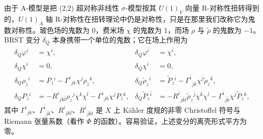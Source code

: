 由于 A-模型是把 (2,2) 超对称非线性 $\sigma$-模型按其 $U(1)_V$ 向量 R-对称性扭转得到的，$U(1)_A$ 轴 R-对称性在扭转理论中仍是对称性，只是在那里我们改称它为鬼数对称性。玻色场的鬼数为 0，费米场 $\chi$ 的鬼数为 1，而场 $\rho$ 与 $\tilde\rho$ 的鬼数为 $-1$。BRST 变分 $\delta_Q$ 本身携带一个单位的鬼数；它在场上作用为
\begin{equation}
\begin{aligned}
\delta_Q\varphi^i &= \chi^i, &
\delta_Q\varphi^{\bar i} &= \chi^{\bar i},\\
\delta_Q\chi^i &= 0, &
\delta_Q\chi^{\bar i} &= 0,\\
\delta_Q\rho_{\bar z}{}^i &= P_{\bar z}{}^i-\Gamma^i{}_{jk}\chi^j\rho_{\bar z}{}^k, &
\delta_Q\tilde\rho_z{}^{\bar i} &= \tilde P_z{}^{\bar i}-\Gamma^{\bar i}{}_{\bar j\bar k}\chi^{\bar j}\tilde\rho_z{}^{\bar k},\\
\delta_QP_{\bar z}{}^i &= -R^i{}_{jk\bar l}\rho_{\bar z}{}^j\chi^k\chi^{\bar l}-\Gamma^i{}_{jk}\chi^jP_{\bar z}{}^k, &
\delta_Q\tilde P_z{}^{\bar i} &= -R^{\bar i}{}_{\bar j\bar k l}\tilde\rho_z{}^{\bar j}\chi^{\bar k}\chi^l-\Gamma^{\bar i}{}_{\bar j\bar k}\chi^{\bar j}\tilde P_z{}^{\bar k},
\end{aligned} \tag{7.2}
\end{equation}
其中 $\Gamma^i{}_{jk}$、$\Gamma^{\bar i}{}_{\bar j\bar k}$、$R^i{}_{jk\bar l}$、$R^{\bar i}{}_{\bar j\bar k l}$ 是 $X$ 上 Kähler 度规的非零 Christoffel 符号与 Riemann 张量系数（看作 $\Phi$ 的函数）。容易验证，上述变分的离壳形式平方为零。


